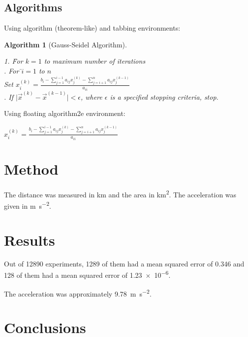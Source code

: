 \documentclass[oneside,12pt]{scrbook}
\theoremstyle{break}
\newtheorem{algorithm}[algocf]{Algorithm}
\begin{document}
\section{Algorithms}

Using algorithm (theorem-like) and tabbing environments:

\begin{algorithm}[Gauss-Seidel Algorithm]
\begin{tabbing}
1. \=For $k=1$ to maximum number of iterations\\
. For \=$i=1$ to $n$\\
\>\>Set
\begin{math}
x_i^{(k)} =
\frac{b_i-\sum_{j=1}^{i-1}a_{ij}x_j^{(k)}
-\sum_{j=i+1}^{n}a_{ij}x_j^{(k-1)}}%
{a_{ii}}
\end{math}
\\
. If $\lvert\vec{x}^{(k)}-\vec{x}^{(k-1)}\rvert < \epsilon$,
where $\epsilon$ is a specified stopping criteria, stop.
\end{tabbing}
\end{algorithm}

Using floating algorithm2e environment:

\begin{algorithm2e}
\caption{Gauss-Seidel Algorithm}\label{alg:gauss-seidel}
{
   {
     $
      x_i^{(k)} =
      \frac{b_i-\sum_{j=1}^{i-1}a_{ij}x_j^{(k)}
      -\sum_{j=i+1}^{n}a_{ij}x_j^{(k-1)}}%
      {a_{ii}}
      $\;
   }
}
\end{algorithm2e}


\chapter{Method}
\label{ch:method}

The distance was measured in \si{\kilo\metre} and the area in
\si{\kilo\metre\squared}. The acceleration was given in
\si{\metre\per\square\second}.

\chapter{Results}
\label{ch:results}

Out of \num{12890} experiments, \num{1289} of them had a mean
squared error of \num{.346} and \num{128} of them had a mean
squared error of \num{1.23e-6}.

The acceleration was approximately
\SI{9.78}{\metre\per\square\second}.


\chapter{Conclusions}
\label{ch:conc}


\backmatter


\printbibliography

\printindex
\end{document}
